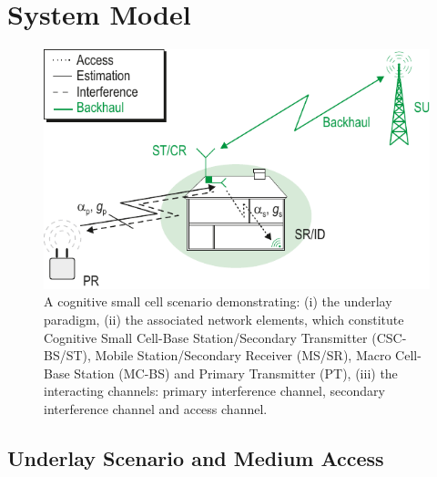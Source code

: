 \section{System Model} \label{sec:sys_mod}
\begin{figure}[!ht]
\centering
\includegraphics[width = \figscalet]{figures/CR_Scenario_Underlay}
\caption{A cognitive small cell scenario demonstrating: (i) the underlay paradigm, (ii) the associated network elements, which constitute Cognitive Small Cell-Base Station/Secondary Transmitter (CSC-BS/ST), Mobile Station/Secondary Receiver (MS/SR), Macro Cell-Base Station (MC-BS) and Primary Transmitter (PT), (iii) the interacting channels: primary interference channel, secondary interference channel and access channel.}
\label{fig:scenario}
\end{figure}

\subsection{Underlay Scenario and Medium Access}


